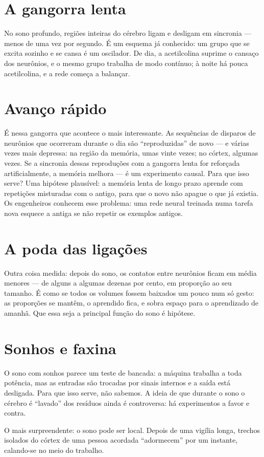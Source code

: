 \section*{A gangorra lenta}

No sono profundo, regiões inteiras do cérebro ligam e desligam em sincronia --- menos de uma vez por segundo. É um esquema já conhecido: um grupo que se excita sozinho e se cansa é um oscilador. De dia, a acetilcolina suprime o cansaço dos neurônios, e o mesmo grupo trabalha de modo contínuo; à noite há pouca acetilcolina, e a rede começa a balançar.


\section*{Avanço rápido}

É nessa gangorra que acontece o mais interessante. As sequências de disparos de neurônios que ocorreram durante o dia são ``reproduzidas'' de novo --- e várias vezes mais depressa: na região da memória, umas vinte vezes; no córtex, algumas vezes. Se a sincronia dessas reproduções com a gangorra lenta for reforçada artificialmente, a memória melhora --- é um experimento causal. Para que isso serve? Uma hipótese plausível: a memória lenta de longo prazo aprende com repetições misturadas com o antigo, para que o novo não apague o que já existia. Os engenheiros conhecem esse problema: uma rede neural treinada numa tarefa nova esquece a antiga se não repetir os exemplos antigos.

\section*{A poda das ligações}

Outra coisa medida: depois do sono, os contatos entre neurônios ficam em média menores --- de alguns a algumas dezenas por cento, em proporção ao seu tamanho. É como se todos os volumes fossem baixados um pouco num só gesto: as proporções se mantêm, o aprendido fica, e sobra espaço para o aprendizado de amanhã. Que essa seja a principal função do sono é hipótese.

\section*{Sonhos e faxina}

O sono com sonhos parece um teste de bancada: a máquina trabalha a toda potência, mas as entradas são trocadas por sinais internos e a saída está desligada. Para que isso serve, não sabemos. A ideia de que durante o sono o cérebro é ``lavado'' dos resíduos ainda é controversa: há experimentos a favor e contra.

O mais surpreendente: o sono pode ser local. Depois de uma vigília longa, trechos isolados do córtex de uma pessoa acordada ``adormecem'' por um instante, calando-se no meio do trabalho.

